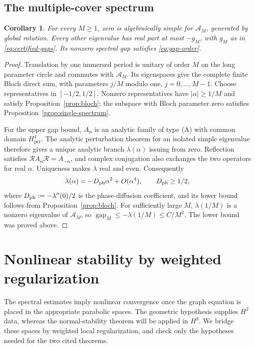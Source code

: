 \documentclass[a4paper,11pt]{article}
\numberwithin{equation}{section}
\newtheorem{corollary}[theorem]{Corollary}
\theoremstyle{definition}
\theoremstyle{remark}
\newcommand{\per}{\mathrm{per}}
\newcommand{\calR}{\mathcal R}
\newcommand{\gap}{\operatorname{gap}}
\begin{document}
\subsection{The multiple-cover spectrum}
\begin{corollary}\label{cor:multicover}
For every $M\ge1$, zero is algebraically simple for $\mathcal A_M$, generated by global rotation. Every other eigenvalue has real part at most $-g_M$, with $g_M$ as in \eqref{eq:certified-gaps}. Its nonzero spectral gap satisfies \eqref{eq:gap-order}.
\end{corollary}
\begin{proof}
Translation by one immersed period is unitary of order $M$ on the long parameter circle and commutes with $\mathcal A_M$. Its eigenspaces give the complete finite Bloch direct sum, with parameters $j/M$ modulo one, $j=0,\ldots,M-1$. Choose representatives in $[-1/2,1/2]$. Nonzero representatives have $|\alpha|\ge1/M$ and satisfy Proposition~\ref{prop:bloch}; the subspace with Bloch parameter zero satisfies Proposition~\ref{prop:single-spectrum}.

For the upper gap bound, $A_\alpha$ is an analytic family of type (A) with common domain $H^4_\per$. The analytic perturbation theorem for an isolated simple eigenvalue \cite[Chapter~VII, Section~1]{Kato} therefore gives a unique analytic branch $\lambda(\alpha)$ issuing from zero. Reflection satisfies $\calR A_\alpha\calR=A_{-\alpha}$, and complex conjugation also exchanges the two operators for real $\alpha$. Uniqueness makes $\lambda$ real and even. Consequently
\[
 \lambda(\alpha)=-D_{\rm ph}\alpha^2+O(\alpha^4),\qquad D_{\rm ph}\ge1/2,
\]
where $D_{\rm ph}:=-\lambda''(0)/2$ is the phase-diffusion coefficient, and its lower bound follows from Proposition~\ref{prop:bloch}. For sufficiently large $M$, $\lambda(1/M)$ is a nonzero eigenvalue of $\mathcal A_M$, so $\gap_M\le-\lambda(1/M)\le C/M^2$. The lower bound was proved above.
\end{proof}


\section{Nonlinear stability by weighted regularization}\label{sec:nonlinear}
The spectral estimates imply nonlinear convergence once the graph equation is placed in the appropriate parabolic spaces. The geometric hypothesis supplies $H^2$ data, whereas the normal-stability theorem will be applied in $H^3$. We bridge these spaces by weighted local regularization, and check only the hypotheses needed for the two cited theorems.
\end{document}
